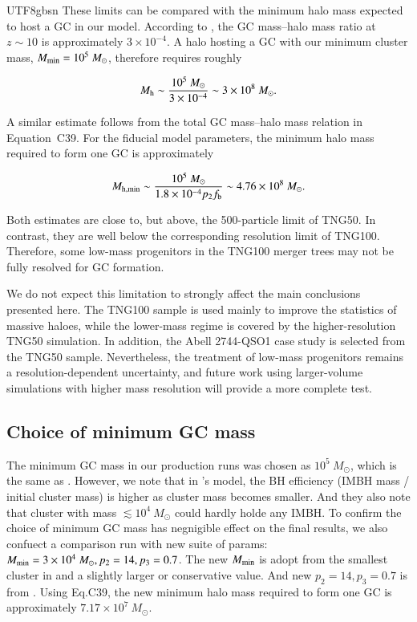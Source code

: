 \documentclass[trackchanges, twocolappendix, twocolumn]{aastex701}
\begin{document}
\begin{CJK*}{UTF8}{gbsn}
These limits can be compared with the minimum halo mass expected to host a GC in our model. According to \citet{Choksi&Gnedin2019GCb}, the GC mass--halo mass ratio at \(z\sim10\) is approximately \(3\times10^{-4}\). A halo hosting a GC with our minimum cluster mass, \(M_{\rm min}=10^5~M_\odot\), therefore requires roughly

$$
M_{\rm h}\sim \frac{10^5~M_\odot}{3\times10^{-4}}
\sim3\times10^8~M_\odot.
$$

A similar estimate follows from the total GC mass--halo mass relation in Equation~C39. For the fiducial model parameters, the minimum halo mass required to form one GC is approximately

$$
M_{\rm h,min}\sim
\frac{10^5~M_\odot}
{1.8\times10^{-4}p_2f_{\rm b}}
\sim4.76\times10^8~M_\odot.
$$

Both estimates are close to, but above, the 500-particle limit of TNG50. In contrast, they are well below the corresponding resolution limit of TNG100. Therefore, some low-mass progenitors in the TNG100 merger trees may not be fully resolved for GC formation.

We do not expect this limitation to strongly affect the main conclusions presented here. The TNG100 sample is used mainly to improve the statistics of massive haloes, while the lower-mass regime is covered by the higher-resolution TNG50 simulation. In addition, the Abell 2744-QSO1 case study is selected from the TNG50 sample. Nevertheless, the treatment of low-mass progenitors remains a resolution-dependent uncertainty, and future work using larger-volume simulations with higher mass resolution will provide a more complete test.

\subsection{Choice of minimum GC mass} \label{subsect:Mmin}

The minimum GC mass in our production runs was chosen as $10^5~M_\odot$, which is the same as \cite{Chen&Gnedin2022GC}. However, we note that in \cite{Rantala+2026FROST}'s model, the BH efficiency (IMBH mass / initial cluster mass) is higher as cluster mass becomes smaller. And they also note that cluster with mass $\lesssim 10^4~M_\odot$ could hardly holde any IMBH. To confirm the choice of minimum GC mass has negnigible effect on the final results, we also confuect a comparison run with new suite of params: $M_{\rm min} = 3 \times 10^4~M_\odot, p_2 = 14, p_3 = 0.7$. The new $M_{\rm min}$ is adopt from the smallest cluster in \cite{Vergara+2026IMBH, Rantala+2025FROST} and a slightly larger or conservative value. And new $p_2 = 14, p_3 = 0.7$ is from \cite{Chen&Gnedin2023GC}. Using Eq.C39, the new minimum halo mass required to form one GC
is approximately $7.17 \times 10^7~M_\odot$.


\end{CJK*}
\end{document}
